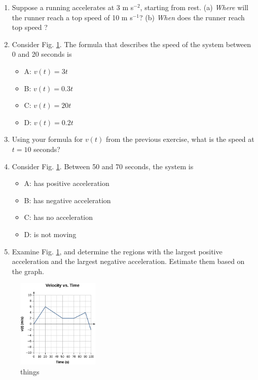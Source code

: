\documentclass{article}
\begin{document}
\begin{enumerate}
\item Suppose a running accelerates at 3 m s$^{-2}$, starting from rest.  (a) \textit{Where} will the runner reach a top speed of 10 m s$^{-1}$? (b) \textit{When} does the runner reach top speed ? \\ \vspace{3cm}
\item Consider Fig. \ref{fig:graph}.  The formula that describes the speed of the system between 0 and 20 seconds is
\begin{itemize}
\item A: $v(t) = 3 t$
\item B: $v(t) = 0.3 t$
\item C: $v(t) = 20 t$
\item D: $v(t) = 0.2 t$
\end{itemize}
\item Using your formula for $v(t)$ from the previous exercise, what is the speed at $t = 10$ seconds? \\ \vspace{2cm}
\item Consider Fig. \ref{fig:graph}.  Between 50 and 70 seconds, the system is
\begin{itemize}
\item A: has positive acceleration
\item B: has negative acceleration
\item C: has no acceleration
\item D: is not moving
\end{itemize}
\item Examine Fig. \ref{fig:graph}, and determine the regions with the largest positive acceleration and the largest negative acceleration.  Estimate them based on the graph. \\ \vspace{2cm}
\end{enumerate}

\begin{figure}
\centering
\includegraphics[width=0.35\textwidth]{figures/v_vs_t.jpeg}
\caption{\label{fig:graph} things}
\end{figure}
\end{document}
